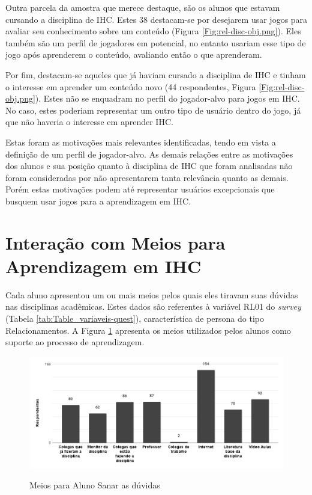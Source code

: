 Outra parcela da amostra que merece destaque, são os alunos que estavam cursando a disciplina de IHC. Estes 38 destacam-se por desejarem usar jogos para avaliar seu conhecimento sobre um conteúdo (Figura \ref{Fig:rel-disc-obj.png}). Eles também são um perfil de jogadores em potencial, no entanto usariam esse tipo de jogo após aprenderem o conteúdo, avaliando então o que aprenderam.

Por fim, destacam-se aqueles que já haviam cursado a disciplina de IHC e tinham o interesse em aprender um conteúdo novo (44 respondentes, Figura \ref{Fig:rel-disc-obj.png}). Estes não se enquadram no perfil do jogador-alvo para jogos em IHC. No caso, estes poderiam representar um outro tipo de usuário dentro do jogo, já que não haveria o interesse em aprender IHC. 

Estas foram as motivações mais relevantes identificadas, tendo em vista a definição de um perfil de jogador-alvo. As demais relações entre as motivações dos alunos e sua posição quanto à disciplina de IHC que foram analisadas não foram consideradas por não apresentarem tanta relevância quanto as demais. Porém estas motivações podem até representar usuários excepcionais que busquem usar jogos para a aprendizagem em IHC.

\section{Interação com Meios para Aprendizagem em IHC}
\label{sec:inter}

Cada aluno apresentou um ou mais meios pelos quais eles tiravam suas dúvidas nas disciplinas acadêmicas. Estes dados são referentes à variável RL01 do \textit{survey} (Tabela \ref{tab:Table_variaveis-quest}), característica de persona do tipo Relacionamentos. A Figura \ref{Fig:rel-rel.png} apresenta os meios utilizados pelos alunos como suporte ao processo de aprendizagem. 

\begin{figure}[htbp]
	\centering
	\caption{Meios para Aluno Sanar as dúvidas}
	\includegraphics[keepaspectratio=true,scale=0.485]{figuras/resultados/rel-rel.png}
	\label{Fig:rel-rel.png}
\end{figure}

